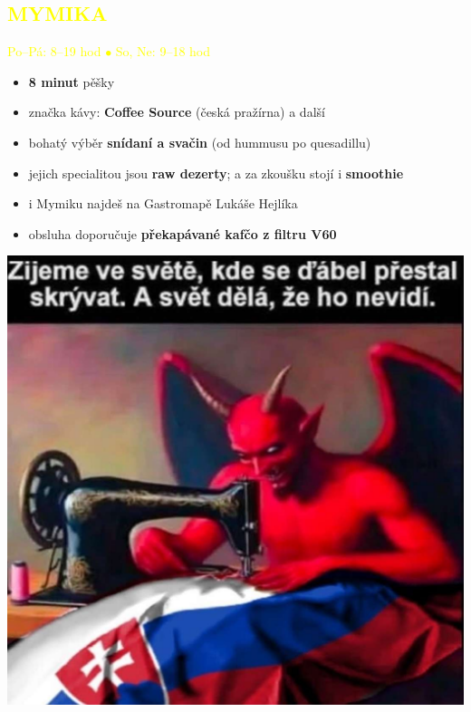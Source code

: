 \documentclass{article}
\newcommand{\podnadpisy}[1]{
  \subsection*{\textcolor{yellow}{#1}}
}
\begin{document}
\pagebreak
\noindent
\begin{minipage}{0.7\textwidth}
  \podnadpisy{MYMIKA}
  \textcolor{yellow}{Po--Pá: 8--19 hod $\bullet$ So, Ne: 9--18 hod}
  \vspace{5pt}
  \small
  \begin{itemize}[leftmargin=10pt]
    \item \textbf{8 minut} pěšky
    \item značka kávy: \textbf{Coffee Source} (česká pražírna) a další
    \item bohatý výběr \textbf{snídaní a svačin} (od hummusu po quesadillu)
    \item jejich specialitou jsou \textbf{raw dezerty}; a za zkoušku stojí i \textbf{smoothie} 
    \item i Mymiku najdeš na Gastromapě Lukáše Hejlíka
    \item obsluha doporučuje \textbf{překapávané kafčo z filtru V60}
  \end{itemize}
\end{minipage}
\hfill
\begin{minipage}{0.27\textwidth}
  \includegraphics[width=\linewidth]{dulezite.jpg}
\end{minipage}
\end{document}
